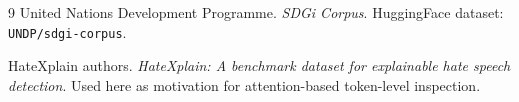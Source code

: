 \documentclass[10pt]{article}
\begin{document}
\begin{thebibliography}{9}
United Nations Development Programme. \emph{SDGi Corpus}. HuggingFace dataset:
\texttt{UNDP/sdgi-corpus}.

HateXplain authors. \emph{HateXplain: A benchmark dataset for explainable hate
speech detection}. Used here as motivation for attention-based token-level
inspection.
\end{thebibliography}
\end{document}
